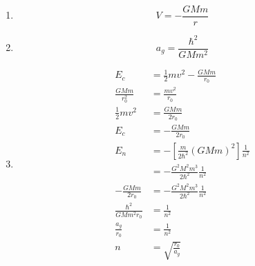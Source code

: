 \documentclass{article}
\begin{document}
\begin{enumerate}
  \item \[V = -\frac{G M m}{r}\]

  \item \[a_g = \frac{\hbar^2}{G M m^2}\]

  \item

        \begin{align*}
          E_c                         & = \frac{1}{2} m v^2 - \frac{G M m}{r_0}                       \\
          \frac{G M m}{r_0^2}         & = \frac{m v^2}{r_0}                                           \\
          \frac{1}{2} m v^2           & = \frac{G M m}{2 r_0}                                         \\
          E_c                         & = -\frac{G M m}{2 r_0}                                        \\
          E_n                         & = -\left[ \frac{m}{2 \hbar^2} (G M m)^2 \right] \frac{1}{n^2} \\
                                      & = -\frac{G^2 M^2 m^3}{2 \hbar^2} \frac{1}{n^2}                \\
          -\frac{G M m}{2 r_0}        & = -\frac{G^2 M^2 m^3}{2 \hbar^2} \frac{1}{n^2}                \\
          \frac{\hbar^2}{G M m^2 r_0} & = \frac{1}{n^2}                                               \\
          \frac{a_g}{r_0}             & = \frac{1}{n^2}                                               \\
          n                           & = \sqrt{\frac{r_0}{a_g}}
        \end{align*}
\end{enumerate}

\subsection{}
\end{document}
